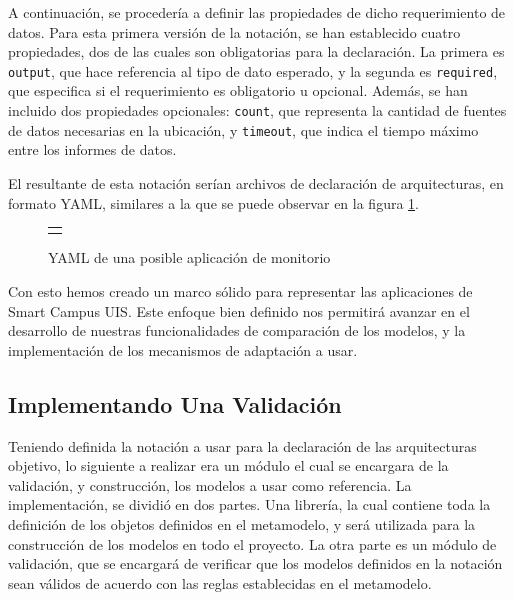A continuación, se procedería a definir las propiedades de dicho requerimiento de datos. Para esta primera versión de la notación, se han establecido cuatro propiedades, dos de las cuales son obligatorias para la declaración. La primera es \texttt{output}, que hace referencia al tipo de dato esperado, y la segunda es \texttt{required}, que especifica si el requerimiento es obligatorio u opcional. Además, se han incluido dos propiedades opcionales: \texttt{count}, que representa la cantidad de fuentes de datos necesarias en la ubicación, y \texttt{timeout}, que indica el tiempo máximo entre los informes de datos.

El resultante de esta notación serían archivos de declaración de arquitecturas, en formato YAML, similares a la que se puede observar en la figura \ref{fig:YAML-ADL}.

\begin{figure}[H]
    \centering
    \caption{YAML de una posible aplicación de monitorio}
    \label{fig:YAML-ADL}
    \begin{tabular}{c}
        \setstretch{1}
        \small
        
    \end{tabular}
\end{figure}

Con esto hemos creado un marco sólido para representar las aplicaciones de Smart Campus UIS. Este enfoque bien definido nos permitirá avanzar en el desarrollo de nuestras funcionalidades de comparación de los modelos, y la implementación de los mecanismos de adaptación a usar. 


\subsection{Implementando Una Validación}

Teniendo definida la notación a usar para la declaración de las arquitecturas objetivo, lo siguiente a realizar era un módulo el cual se encargara de la validación, y construcción, los modelos a usar como referencia. La implementación, se dividió en dos partes. Una librería, la cual contiene toda la definición de los objetos definidos en el metamodelo, y será utilizada para la construcción de los modelos en todo el proyecto. La otra parte es un módulo de validación, que se encargará de verificar que los modelos definidos en la notación sean válidos de acuerdo con las reglas establecidas en el metamodelo.

